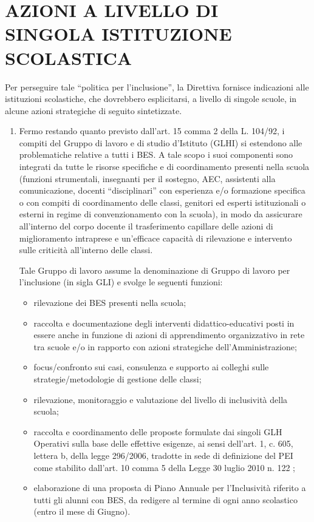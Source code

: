 \section*{AZIONI A LIVELLO DI SINGOLA ISTITUZIONE SCOLASTICA}
Per perseguire tale “politica per l'inclusione”, la Direttiva fornisce indicazioni alle istituzioni
scolastiche, che dovrebbero esplicitarsi, a livello di singole scuole, in alcune azioni strategiche di
seguito sintetizzate.
\begin{enumerate}
	\item Fermo restando quanto previsto dall'art. 15 comma 2 della L. 104/92, i compiti del Gruppo di
	lavoro e di studio d'Istituto (GLHI) si estendono alle problematiche relative a tutti i BES. A
	tale scopo i suoi componenti sono integrati da tutte le risorse specifiche e di coordinamento
	presenti nella scuola (funzioni strumentali, insegnanti per il sostegno, AEC, assistenti alla
	comunicazione, docenti “disciplinari” con esperienza e/o formazione specifica o con compiti di
	coordinamento delle classi, genitori ed esperti istituzionali o esterni in regime di
	convenzionamento con la scuola), in modo da assicurare all'interno del corpo docente il
	trasferimento capillare delle azioni di miglioramento intraprese e un'efficace capacità di
	rilevazione e intervento sulle criticità all'interno delle classi.
	
	Tale Gruppo di lavoro assume la denominazione di Gruppo di lavoro per l'inclusione (in sigla
	GLI) e svolge le seguenti funzioni:
	\begin{itemize}
		\item rilevazione dei BES presenti nella scuola;
		\item raccolta e documentazione degli interventi didattico-educativi posti in essere anche in
		funzione di azioni di apprendimento organizzativo in rete tra scuole e/o in rapporto con
		azioni strategiche dell'Amministrazione;
		\item focus/confronto sui casi, consulenza e supporto ai colleghi sulle strategie/metodologie di
		gestione delle classi;
		\item rilevazione, monitoraggio e valutazione del livello di inclusività della scuola;
		\item raccolta e coordinamento delle proposte formulate dai singoli GLH Operativi sulla base
		delle effettive esigenze, ai sensi dell'art. 1, c. 605, lettera b, della legge 296/2006, tradotte
		in sede di definizione del PEI come stabilito dall'art. 10 comma 5 della Legge 30 luglio
		2010 n. 122 ;
		\item elaborazione di una proposta di Piano Annuale per l'Inclusività riferito a tutti gli
		alunni con BES, da redigere al termine di ogni anno scolastico (entro il mese di Giugno).
		

\end{itemize}
\end{enumerate}
